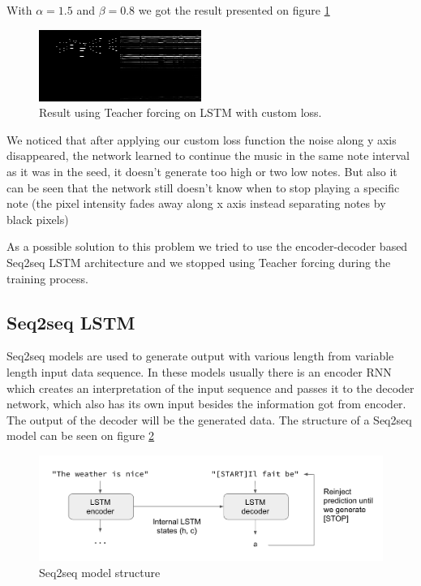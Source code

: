 \documentclass{article}
\begin{document}
With $\alpha = 1.5$ and $\beta = 0.8$ we got the result presented on figure \ref{fig:LSTMresult-2}

\begin{figure}[!htb]
	\centering
	\includegraphics[width=\linewidth]{LSTMresult2.png}
	\caption{Result using Teacher forcing on LSTM with custom loss.}
	\label{fig:LSTMresult-2}
\end{figure}

We noticed that after applying our custom loss function the noise along y axis disappeared, the network learned to continue the music in the same note interval as it was in the seed, it doesn't generate too high or two low notes. But also it can be seen that the network still doesn't know when to stop playing a specific note (the pixel intensity fades away along x axis instead separating notes by black pixels) 

As a possible solution to this problem we tried to use the encoder-decoder based Seq2seq LSTM architecture and we stopped using Teacher forcing during the training process. 

\subsection{Seq2seq LSTM}

Seq2seq models are used to generate output with various length from variable length input data sequence. In these models usually there is an encoder RNN which creates an interpretation of the input sequence and passes it to the decoder network, which also has its own input besides the information got from encoder. The output of the decoder will be the generated data. The structure of a Seq2seq model can be seen on figure \ref{fig:seq2seqmodel}

\begin{figure}[!htb]
	\centering
	\includegraphics[width=\linewidth]{seq2seqmodel.png}
	\caption{Seq2seq model structure}
	\label{fig:seq2seqmodel}
\end{figure}
\end{document}

